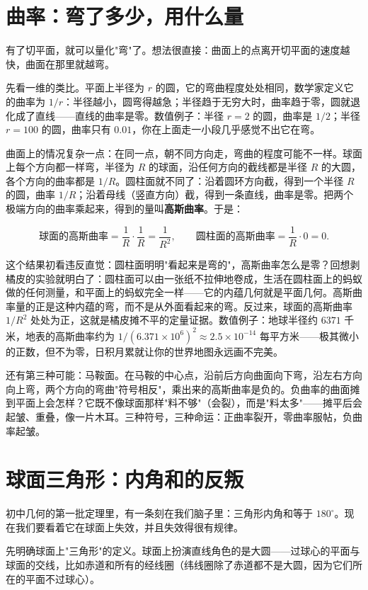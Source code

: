 \section{曲率：弯了多少，用什么量}

有了切平面，就可以量化"弯"了。想法很直接：曲面上的点离开切平面的速度越快，曲面在那里就越弯。

先看一维的类比。平面上半径为 $r$ 的圆，它的弯曲程度处处相同，数学家定义它的曲率为 $1/r$：半径越小，圆弯得越急；半径趋于无穷大时，曲率趋于零，圆就退化成了直线——直线的曲率是零。数值例子：半径 $r=2$ 的圆，曲率是 $1/2$；半径 $r=100$ 的圆，曲率只有 $0.01$，你在上面走一小段几乎感觉不出它在弯。

曲面上的情况复杂一点：在同一点，朝不同方向走，弯曲的程度可能不一样。球面上每个方向都一样弯，半径为 $R$ 的球面，沿任何方向的截线都是半径 $R$ 的大圆，各个方向的曲率都是 $1/R$。圆柱面就不同了：沿着圆环方向截，得到一个半径 $R$ 的圆，曲率 $1/R$；沿着母线（竖直方向）截，得到一条直线，曲率是零。把两个极端方向的曲率乘起来，得到的量叫\textbf{高斯曲率}。于是：

\[ \text{球面的高斯曲率} = \frac{1}{R}\cdot\frac{1}{R} = \frac{1}{R^2}, \qquad \text{圆柱面的高斯曲率} = \frac{1}{R}\cdot 0 = 0. \]

这个结果初看违反直觉：圆柱面明明"看起来是弯的"，高斯曲率怎么是零？回想剥橘皮的实验就明白了：圆柱面可以由一张纸不拉伸地卷成，生活在圆柱面上的蚂蚁做的任何测量，和平面上的蚂蚁完全一样——它的内蕴几何就是平面几何。高斯曲率量的正是这种内蕴的弯，而不是从外面看起来的弯。反过来，球面的高斯曲率 $1/R^2$ 处处为正，这就是橘皮摊不平的定量证据。数值例子：地球半径约 $6371$ 千米，地表的高斯曲率约为 $1/(6.371\times 10^6)^2 \approx 2.5\times 10^{-14}$ 每平方米——极其微小的正数，但不为零，日积月累就让你的世界地图永远画不完美。

还有第三种可能：马鞍面。在马鞍的中心点，沿前后方向曲面向下弯，沿左右方向向上弯，两个方向的弯曲"符号相反"，乘出来的高斯曲率是负的。负曲率的曲面摊到平面上会怎样？它既不像球面那样"料不够"（会裂），而是"料太多"——摊平后会起皱、重叠，像一片木耳。三种符号，三种命运：正曲率裂开，零曲率服帖，负曲率起皱。

\section{球面三角形：内角和的反叛}

初中几何的第一批定理里，有一条刻在我们脑子里：三角形内角和等于 $180^\circ$。现在我们要看着它在球面上失效，并且失效得很有规律。

先明确球面上"三角形"的定义。球面上扮演直线角色的是大圆——过球心的平面与球面的交线，比如赤道和所有的经线圈（纬线圈除了赤道都不是大圆，因为它们所在的平面不过球心）。

